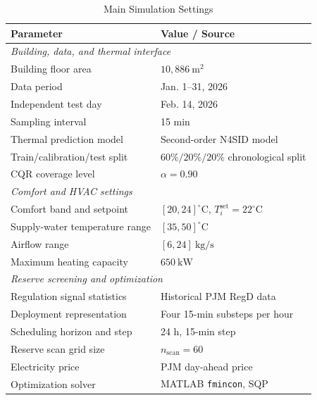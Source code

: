 \documentclass[journal]{IEEEtran}
\theoremstyle{remark}
\begin{document}
	
	\begin{table}[t]
		\caption{Main Simulation Settings}
		\label{tab:simulation_setup}
		\centering
		\footnotesize
		\setlength{\tabcolsep}{3pt}
		\renewcommand{\arraystretch}{1.05}
		\begin{tabular}{p{} p{}}
			\toprule
			\textbf{Parameter} & \textbf{Value / Source} \\
			\midrule
			\multicolumn{2}{l}{\textit{Building, data, and thermal interface}} \\
			Building floor area & \(10{,}886~\mathrm{m}^2\) \\
			Data period & Jan. 1--31, 2026 \\
			Independent test day & Feb. 14, 2026 \\
			Sampling interval & 15 min \\
			Thermal prediction model & Second-order N4SID model \\
			Train/calibration/test split & \(60\%/20\%/20\%\) chronological split \\
			CQR coverage level & \(\alpha=0.90\) \\
			\midrule
			\multicolumn{2}{l}{\textit{Comfort and HVAC settings}} \\
			Comfort band and setpoint & \([20,24]^\circ\mathrm{C}\), \(T_i^{\mathrm{set}}=22^\circ\mathrm{C}\) \\
			Supply-water temperature range & \([35,50]^\circ\mathrm{C}\) \\
			Airflow range & \([6,24]~\mathrm{kg/s}\) \\
			Maximum heating capacity & \(650~\mathrm{kW}\) \\
			\midrule
			\multicolumn{2}{l}{\textit{Reserve screening and optimization}} \\
			Regulation signal statistics & Historical PJM RegD data \cite{PJM_MarketBasedRegulation} \\
			Deployment representation & Four 15-min substeps per hour \\
			Scheduling horizon and step & 24 h, 15-min step \\
			Reserve scan grid size & \(n_{\mathrm{scan}}=60\) \\
			Electricity price & PJM day-ahead price \\
			Optimization solver & MATLAB \texttt{fmincon}, SQP \cite{MathWorks_OptimizationToolbox} \\
			\bottomrule
		\end{tabular}
	\end{table}
	
\end{document}
